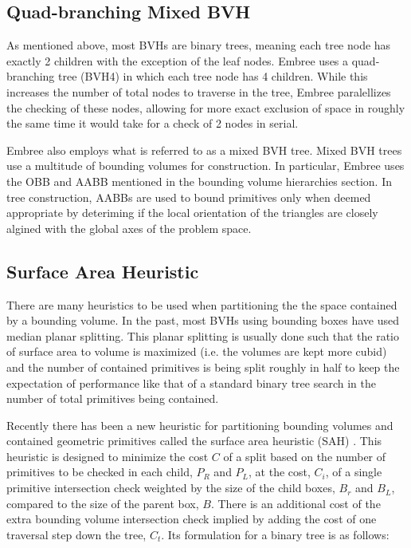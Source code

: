 \documentclass{anstrans}
\begin{document}
\subsection{Quad-branching Mixed BVH}

As mentioned above, most BVHs are binary trees, meaning each tree node has exactly 2 children with the exception of the leaf nodes. Embree uses a quad-branching tree (BVH4) in which each tree node has 4 children. While this increases the number of total nodes to traverse in the tree, Embree paralellizes the checking of these nodes, allowing for more exact exclusion of space in roughly the same time it would take for a check of 2 nodes in serial. 

Embree also employs what is referred to as a mixed BVH tree. Mixed BVH trees use a multitude of bounding volumes for construction. In particular, Embree uses the OBB and AABB mentioned in the bounding volume hierarchies section. In tree construction, AABBs are used to bound primitives only when deemed appropriate by deteriming if the local orientation of the triangles are closely algined with the global axes of the problem space. 

\subsection{Surface Area Heuristic}

There are many heuristics to be used when partitioning the the space contained by a bounding volume. In the past, most BVHs using bounding boxes have used median planar splitting. This planar splitting is usually done such that the ratio of surface area to volume is maximized (i.e. the volumes are kept more cubid) and the number of contained primitives is being split roughly in half to keep the expectation of performance like that of a standard binary tree search in the number of total primitives being contained. 

Recently there has been a new heuristic for partitioning bounding volumes and contained geometric primitives called the surface area heuristic (SAH) \cite{sah}. This heuristic is designed to minimize the cost $C$ of a split based on the number of primitives to be checked in each child, $P_{R}$ and $P_{L}$, at the cost, $C_{i}$, of a single primitive intersection check weighted by the size of the child boxes, $B_{r}$ and $B_{L}$, compared to the size of the parent box, $B$. There is an additional cost of the extra bounding volume intersection check implied by adding the cost of one traversal step down the tree, $C_{t}$.
Its formulation for a binary tree is as follows: 
\end{document}
